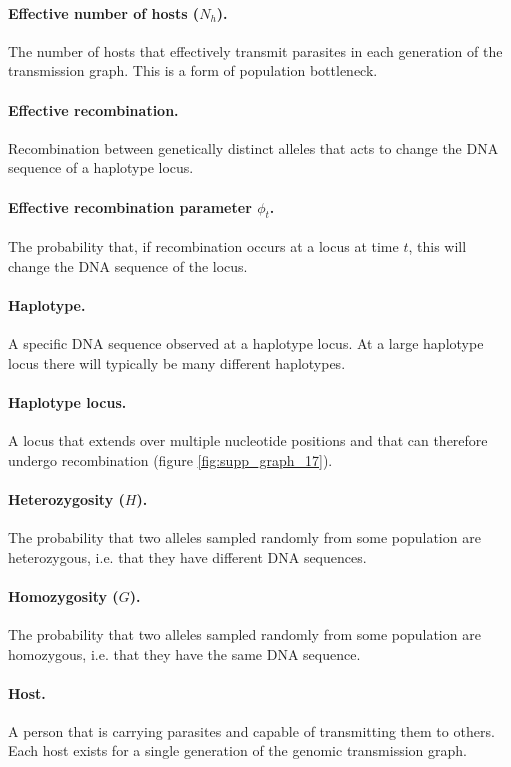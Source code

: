 \documentclass[_main.tex]{subfiles}
\begin{document}
\paragraph{Effective number of hosts ($N_h$).}   The number of hosts that effectively transmit parasites in each generation of the transmission graph.  This is a form of population bottleneck. 

\paragraph{Effective recombination.}  Recombination between genetically distinct alleles that acts to change the DNA sequence of a haplotype locus.

\paragraph{Effective recombination parameter $\phi_t$.}  The probability that, if recombination occurs at a locus at time $t$, this will change the DNA sequence of the locus.

\paragraph{Haplotype.}  A specific DNA sequence observed at a haplotype locus.  At a large haplotype locus there will typically be many different haplotypes.

\paragraph{Haplotype locus.}  A locus that extends over multiple nucleotide positions and that can therefore undergo recombination (figure \ref{fig:supp_graph_17}).

\paragraph{Heterozygosity ($H$).}  The probability that two alleles sampled randomly from some population are heterozygous, i.e. that they have different DNA sequences. 

\paragraph{Homozygosity ($G$).}  The probability that two alleles sampled randomly from some population are homozygous, i.e. that they have the same DNA sequence.

\paragraph{Host.}  A person that is carrying parasites and capable of transmitting them to others.  Each host exists for a single generation of the genomic transmission graph.  
\end{document}
